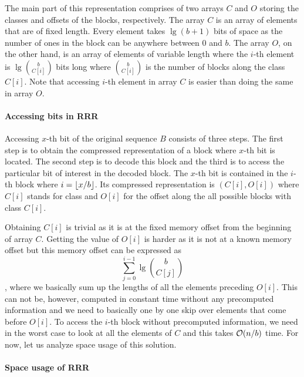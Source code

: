 The main part of this representation comprises of two arrays $C$ and $O$ storing the classes and offsets of
the blocks, respectively. The array $C$ is an array of elements that are of fixed length. Every element takes
$\lg (b+1)$ bits of space as the number of ones in the block can be anywhere between 0 and $b$. The array $O$,
on the other hand, is an array of elements of variable length where the $i$-th element is $\lg {b\choose C[i]}$
bits long where ${b\choose C[i]}$ is the number of blocks along the class $C[i]$. Note that accessing $i$-th element
in array $C$ is easier than doing the same in array $O$.

\paragraph{Accessing bits in RRR}

Accessing $x$-th bit of the original sequence $B$ consists of three steps. The first step is to obtain the
compressed representation of a block where $x$-th bit is located. The second step is to decode this block and
the third is to access the particular bit of interest in the decoded block. The $x$-th bit is contained in the
$i$-th block where $i=\left\lfloor x/b \right\rfloor$. Its compressed representation is $(C[i], O[i])$ where $C[i]$ stands for class
and $O[i]$ for the offset along the all possible blocks with class $C[i]$.

Obtaining $C[i]$ is trivial as it is at the fixed memory offset from the beginning of array $C$. Getting the
value of $O[i]$ is harder as it is not at a known memory offset but this memory offset can be expressed as
$$\sum_{j=0}^{i-1} \lg {b\choose C[j]}$$, where we basically sum up the lengths of all the elements preceding
$O[i]$. This can not be, however, computed in constant time without any precomputed information and we
need to basically one by one skip over elements that come before $O[i]$. To access the $i$-th block without
precomputed information, we need in the worst case to look at all the elements of $C$ and this takes $\mathcal{O}(n/b)$
time. For now, let us analyze space usage of this solution.


\paragraph{Space usage of RRR}


